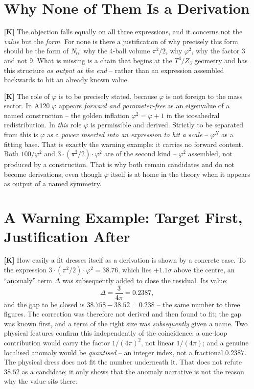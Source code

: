 \section{Why None of Them Is a Derivation}

\textbf{[K]} The objection falls equally on all three expressions, and it concerns
not the \emph{value} but the \emph{form}. For none is there a justification of
why precisely this form should be the form of $N_0$: why the 4-ball volume
$\pi^2/2$, why $\varphi^2$, why the factor $3$ and not $9$. What is missing is a
chain that begins at the $T^4/Z_3$ geometry and has this structure \emph{as output
at the end} -- rather than an expression assembled backwards to hit an already
known value.

\textbf{[K]} The role of $\varphi$ is to be precisely stated, because $\varphi$
is not foreign to the mass sector. In A120 $\varphi$ appears \emph{forward and
parameter-free} as an eigenvalue of a named construction -- the golden inflation
$\varphi^2 = \varphi + 1$ in the icosahedral redistribution. In \emph{this} role
$\varphi$ is permissible and derived. Strictly to be separated from this is
$\varphi$ as a \emph{power inserted into an expression to hit a scale} --
$\varphi^N$ as a fitting base. That is exactly the warning example: it carries no
forward content. Both $100/\varphi^2$ and $3\cdot(\pi^2/2)\cdot\varphi^2$ are of
the second kind -- $\varphi^2$ assembled, not produced by a construction. That is
why both remain candidates and do not become derivations, even though $\varphi$
itself is at home in the theory when it appears as output of a named symmetry.

\section{A Warning Example: Target First, Justification After}

\textbf{[K]} How easily a fit dresses itself as a derivation is shown by a
concrete case. To the expression $3\cdot(\pi^2/2)\cdot\varphi^2 = 38{.}76$,
which lies $+1{.}1\sigma$ above the centre, an ``anomaly'' term $\Delta$ was
subsequently added to close the residual. Its value:
\[
  \Delta = \frac{3}{4\pi} = 0{.}2387 ,
\]
and the gap to be closed is $38{.}758 - 38{.}52 = 0{.}238$ -- the same number to
three figures. The correction was therefore not derived and then found to fit; the
gap was known first, and a term of the right size was \emph{subsequently} given a
name. Two physical features confirm this independently of the coincidence: a
one-loop contribution would carry the factor $1/(4\pi)^2$, not linear $1/(4\pi)$;
and a genuine localised anomaly would be \emph{quantised} -- an integer index, not
a fractional $0{.}2387$. The physical dress does not fit the number underneath it.
That does not refute $38{.}52$ as a candidate; it only shows that the anomaly
narrative is not the reason why the value sits there.

